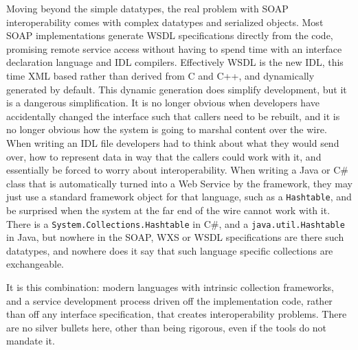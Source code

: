 \documentclass[draft]{report}
\begin{document}
Moving beyond the simple datatypes, the real problem with SOAP
interoperability comes with complex datatypes and serialized objects.
Most SOAP implementations generate WSDL specifications directly from the
code, promising remote service access without having to spend time with
an interface declaration language and IDL compilers. Effectively WSDL is
the new IDL, this time XML based rather than derived from C and C++, and
dynamically generated by default. This dynamic generation does simplify
development, but it is a dangerous simplification. It is no longer
obvious when developers have accidentally changed the interface such
that callers need to be rebuilt, and it is no longer obvious how the
system is going to marshal content over the wire. When writing an IDL
file developers had to think about what they would send over, how to
represent data in way that the callers could work with it, and
essentially be forced to worry about interoperability. When writing a
Java or C\# class that is automatically turned into a Web Service by the
framework, they may just use a standard framework object for that
language, such as a \verb$Hashtable$, and be surprised when the system
at the far end of the wire cannot work with it. There is a
\verb|System.Collections.Hashtable| in C\#, and a
\verb|java.util.Hashtable| in Java, but nowhere in the SOAP, WXS or WSDL
specifications are there such datatypes, and nowhere does it say that
such language specific collections are exchangeable.

It is this combination: modern languages with intrinsic collection
frameworks, and a service development process driven off the
implementation code, rather than off any interface specification, that
creates interoperability problems. There are no silver bullets here,
other than being rigorous, even if the tools do not mandate it.
\end{document}

